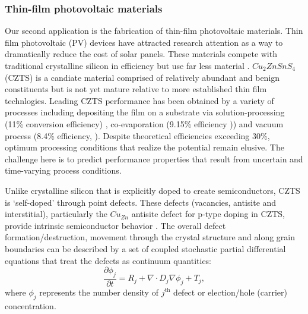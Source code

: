 \documentclass[11pt]{article}
\newcommand{\MarginPar}[1]{\marginpar{%
\vskip-\baselineskip %
\raggedright\tiny\sffamily
\hrule\smallskip{\color{red}#1}\par\smallskip\hrule}}
\begin{document}
\subsubsection*{Thin-film photovoltaic materials}
Our second  application 
is the fabrication of thin-film photovoltaic
materials. 
Thin film photovoltaic (PV) devices have attracted research attention
as a way to dramatically reduce the cost of solar panels. These
materials compete with traditional crystalline silicon in efficiency but use far less
material \cite{JiangY13}. 
$Cu_2ZnSnS_4$ (CZTS) \cite{JiangY13} is a candiate material
comprised of relatively abundant and benign constituents but is not yet mature relative to more established thin film technlogies. 
Leading  CZTS  performance has been obtained by a variety of processes including depositing the film on a substrate via
solution-processing (11\% conversion efficiency) \cite{Todorov13},
co-evaporation (9.15\% efficiency \cite{Repins12})) and vacuum
process (8.4\% efficiency, \cite{Shin11}). Despite theoretical
efficiencies exceeding 30\%,  optimum processing conditions
that realize the potential remain elusive.
The challenge here is to 
predict performance properties that result from uncertain and time-varying process
conditions.

Unlike crystalline silicon that is explicitly doped
to create  semiconductors, CZTS is
`self-doped' through point defects.
These defects (vacancies, antisite and interstitial), particularly
the $Cu_{Zn}$ antisite defect for p-type doping in CZTS, provide intrinsic 
semiconductor behavior
\cite{JiangY13}. The overall defect formation/destruction, movement
through the crystal structure and along grain boundaries can be
described by a set of coupled stochastic partial differential
\MarginPar{JBB: is j refer to a type of defect?}
equations that treat the defects as continuum
quantities:
\begin{equation}
  \label{eq:pdpde}
  \frac{\partial \phi_j}{\partial t}  = R_j + \nabla \cdot  D_j \nabla \phi_j  + T_j,
\end{equation}
where $\phi_j$ represents the number density of $j^\mathrm{th}$ defect or election/hole (carrier) concentration. 
\end{document}
